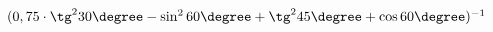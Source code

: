 \begin{ex}[type=calculate]
	\begin{condition}
		\( (0,75\cdot\tg^2 30\degree - \sin^2 60\degree + \tg^2 45\degree +\cos60\degree)^{-1} \)
	\end{condition}
\end{ex}